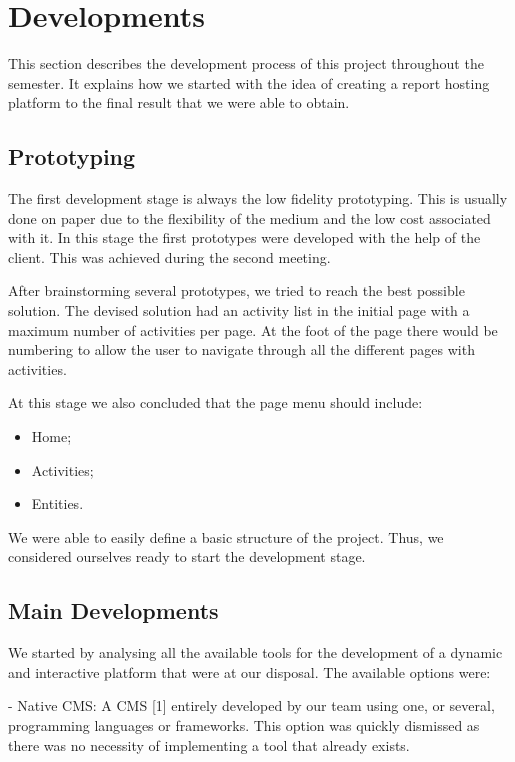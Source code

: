 \documentclass[a4paper,12pt,journal,twoside,compsoc]{PPIEEEtran}
\begin{document}

\section{Developments}

This section describes the development process of this project throughout the semester. It explains how we started with the idea of creating a report hosting platform to the final result that we were able to obtain.

\subsection{Prototyping}

The first development stage is always the low fidelity prototyping. This is usually done on paper due to the flexibility of the medium and the low cost associated with it. In this stage the first prototypes were developed with the help of the client. This was achieved during the second meeting.

After brainstorming several prototypes, we tried to reach the best possible solution. The devised solution had an activity list in the initial page with a maximum number of activities per page. At the foot of the page there would be numbering to allow the user to navigate through all the different pages with activities.

At this stage we also concluded that the page menu should include:
\begin{itemize}
	\item Home;
	\item Activities;
	\item Entities.
\end{itemize}

We were able to easily define a basic structure of the project. Thus, we considered ourselves ready to start the development stage.

\subsection{Main Developments}

We started by analysing all the available tools for the development of a dynamic and interactive platform that were at our disposal. The available options were:

- Native \ac{CMS}: A \ac{CMS} [1] entirely developed by our team using one, or several, programming languages or frameworks. This option was quickly dismissed as there was no necessity of implementing a tool that already exists.
\end{document}
